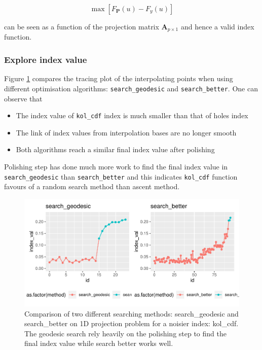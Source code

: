 \documentclass[12pt]{article}
\providecommand{\tightlist}{%
  \setlength{\itemsep}{0pt}\setlength{\parskip}{0pt}}
\begin{document}
\[\max \left[F_{\mathbf{P}}(u) - F_{y}(u)\right]\]

can be seen as a function of the projection matrix
\(\mathbf{A}_{p \times 1}\) and hence a valid index function.

\hypertarget{explore-index-value}{%
\subsubsection{Explore index value}\label{explore-index-value}}

Figure \ref{kol-cdf} compares the tracing plot of the interpolating
points when using different optimisation algorithms:
\texttt{search\_geodesic} and \texttt{search\_better}. One can observe
that

\begin{itemize}
\tightlist
\item
  The index value of \texttt{kol\_cdf} index is much smaller than that
  of holes index
\item
  The link of index values from interpolation bases are no longer smooth
\item
  Both algorithms reach a similar final index value after polishing
\end{itemize}

Polishing step has done much more work to find the final index value in
\texttt{search\_geodesic} than \texttt{search\_better} and this
indicates \texttt{kol\_cdf} function favours of a random search method
than ascent method.

\begin{figure}
\centering
\includegraphics{paper_files/figure-latex/kol-cdf-1.pdf}
\caption{\label{kol-cdf}Comparison of two different searching methods:
search\_geodesic and search\_better on 1D projection problem for a
noisier index: kol\_cdf. The geodesic search rely heavily on the
polishing step to find the final index value while search better works
well.}
\end{figure}
\end{document}
